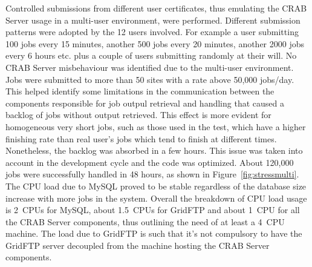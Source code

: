 Controlled submissions from different user certificates, thus 
emulating the CRAB Server usage in a multi-user environment, were performed.
Different submission patterns were adopted by the 12 users
involved. For example a user submitting 100 jobs every 15 minutes,
another 500 jobs every 20 minutes, another 2000 jobs every 6 hours
etc. plus a couple of users submitting randomly at their will.  No
CRAB Server misbehaviour was identified due to the multi-user
environment. %
Jobs were submitted to more than 50 sites with a rate above 50,000 jobs/day.
This helped identify some limitations in the communication between 
the components responsible for job outpul retrieval and handling that caused a backlog of jobs without output retrieved. This effect is more evident for homogeneous very short
jobs, such as those used in the test, which have a higher finishing rate
than real user's jobs which tend to finish at different times. Nonetheless, the backlog was absorbed in a few hours. This issue was
taken into account in the development cycle and the code was
optimized.  About 120,000 jobs were successfully handled in 48 hours,
as shown in Figure~\ref{fig:stressmulti}.  The CPU load due to MySQL
proved to be stable regardless of the database size increase with more
jobs in the system. Overall the breakdown of CPU load usage is 2~CPUs
for MySQL, about 1.5~CPUs for GridFTP and about 1~CPU for all the CRAB
Server components, thus outlining the need of at least a 4~CPU
machine.  The load due to GridFTP is such that it's not compulsory to
have the GridFTP server decoupled from the machine hosting the CRAB
Server components.

